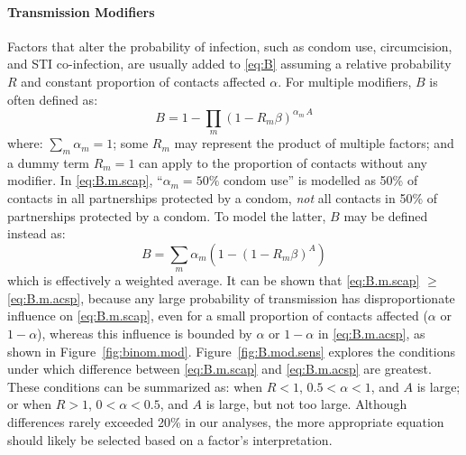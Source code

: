 \paragraph{Transmission Modifiers}
Factors that alter the probability of infection,
such as condom use, circumcision, and STI co-infection,
are usually added to \eqref{eq:B} assuming
a relative probability $R$ and constant proportion of contacts affected $\alpha$.
For multiple modifiers, $B$ is often defined as:
\begin{equation}\label{eq:B.m.scap}
  B = 1 - \prod_{m} {(1 - R_m \beta)}^{\alpha_m\,A}
\end{equation}
where: $\sum_m \alpha_m = 1$;
some $R_m$ may represent the product of multiple factors;
and a dummy term $R_m = 1$ can apply to the proportion of contacts without any modifier.
In \eqref{eq:B.m.scap}, ``$\alpha_m = 50\%$ condom use'' is modelled as
50\% of contacts in all partnerships protected by a condom,
\emph{not} all contacts in 50\% of partnerships protected by a condom.
To model the latter, $B$ may be defined instead as:
\begin{equation}\label{eq:B.m.acsp}
  B = \sum_{m} \alpha_m \left(1 - {(1 - R_m \beta)}^A\right)
\end{equation}
which is effectively a weighted average.
It can be shown that \eqref{eq:B.m.scap} $\ge$ \eqref{eq:B.m.acsp},
because any large probability of transmission
has disproportionate influence on \eqref{eq:B.m.scap},
even for a small proportion of contacts affected ($\alpha$ or $1-\alpha$),
whereas this influence is bounded by $\alpha$ or $1-\alpha$ in \eqref{eq:B.m.acsp},
as shown in Figure~\ref{fig:binom.mod}.
Figure~\ref{fig:B.mod.sens} explores the conditions under which
difference between \eqref{eq:B.m.scap} and \eqref{eq:B.m.acsp} are greatest.
These conditions can be summarized as:
when $R < 1$, $0.5 < \alpha < 1$, and $A$ is large; or
when $R > 1$, $0 < \alpha < 0.5$, and $A$ is large, but not too large.
Although differences rarely exceeded 20\% in our analyses,
the more appropriate equation should likely be selected based on a factor's interpretation.

